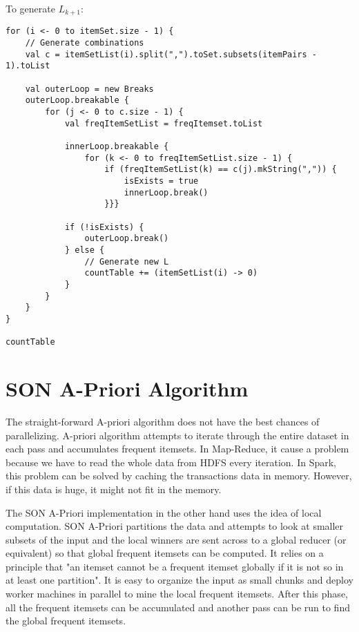 \documentclass[11pt]{article}
\begin{document}
To generate $L_{k+1}$: \\

\begin{lstlisting}
for (i <- 0 to itemSet.size - 1) {
    // Generate combinations
    val c = itemSetList(i).split(",").toSet.subsets(itemPairs - 1).toList

    val outerLoop = new Breaks
    outerLoop.breakable {
        for (j <- 0 to c.size - 1) {
            val freqItemSetList = freqItemset.toList

            innerLoop.breakable {
                for (k <- 0 to freqItemSetList.size - 1) {
                    if (freqItemSetList(k) == c(j).mkString(",")) {
                        isExists = true
                        innerLoop.break()
                    }}}

            if (!isExists) {
                outerLoop.break()
            } else {
                // Generate new L
                countTable += (itemSetList(i) -> 0)
            }
        }
    }
}

countTable
\end{lstlisting}

\section{SON A-Priori Algorithm}

The straight-forward A-priori algorithm does not have the best chances of parallelizing.
A-priori algorithm attempts to iterate through the entire dataset in each pass and accumulates frequent itemsets.
In Map-Reduce, it cause a problem because we have to read the whole data from HDFS every iteration.
In Spark, this problem can be solved by caching the transactions data in memory.
However, if this data is huge, it might not fit in the memory.

The SON A-Priori implementation in the other hand uses the idea of local computation.
SON A-Priori partitions the data and attempts to look at smaller subsets of the input and the local winners are sent across to a global reducer (or equivalent) so that global frequent itemsets can be computed.
It relies on a principle that "an itemset cannot be a frequent itemset globally if it is not so in at least one partition".
It is easy to organize the input as small chunks and deploy worker machines in parallel to mine the local frequent itemsets.
After this phase, all the frequent itemsets can be accumulated and another pass can be run to find the global frequent itemsets.
\end{document}
